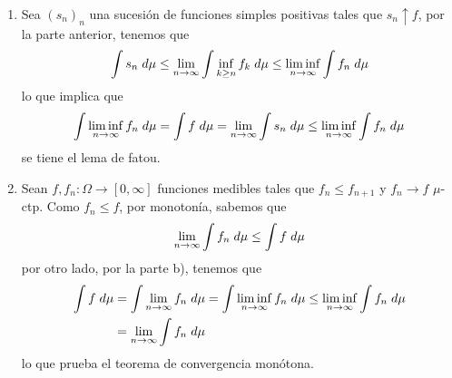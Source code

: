 \documentclass{article}
\begin{document}
\begin{enumerate}
    \item Sea $(s_{n})_{n}$ una sucesión de funciones simples positivas tales que 
    $s_{n}\uparrow f$, por la parte anterior, tenemos que
    \begin{equation*}
        \int s_{n}\hspace{1mm}d\mu\leq\lim\limits_{n\to\infty}\int \inf_{k\geq n}
        f_{k}\hspace{1mm}d\mu\leq\liminf\limits_{n\to\infty}\int f_{n}\hspace{1mm}d\mu
    \end{equation*}
    lo que implica que
    \begin{equation*}
        \int \liminf\limits_{n\to\infty}f_{n}\hspace{1mm}d\mu=\int f\hspace{1mm}d\mu
        =\lim\limits_{n\to\infty}\int s_{n}\hspace{1mm}d\mu
        \leq\liminf\limits_{n\to\infty}\int f_{n}\hspace{1mm}d\mu
    \end{equation*}
    se tiene el lema de fatou.

    \item Sean $f,f_{n}:\Omega\to[0,\infty]$ funciones medibles tales que $f_{n}\leq f_{n+1}$ y
    $f_{n}\to f$ $\mu$-ctp. Como $f_{n}\leq f$, por monotonía, sabemos que
    \begin{equation*}
        \lim\limits_{n\to\infty}\int f_{n}\hspace{1mm}d\mu\leq\int f\hspace{1mm}d\mu
    \end{equation*}
    por otro lado, por la parte b), tenemos que
    \begin{align*}
        \int f\hspace{1mm}d\mu &= \int \lim\limits_{n\to\infty}f_{n}\hspace{1mm}d\mu
        =\int \liminf\limits_{n\to\infty}f_{n}\hspace{1mm}d\mu
        \leq\liminf\limits_{n\to\infty}\int f_{n}\hspace{1mm}d\mu \\
        &= \lim\limits_{n\to\infty}\int f_{n}\hspace{1mm}d\mu
    \end{align*}
    lo que prueba el teorema de convergencia monótona.
\end{enumerate}
\end{document}
